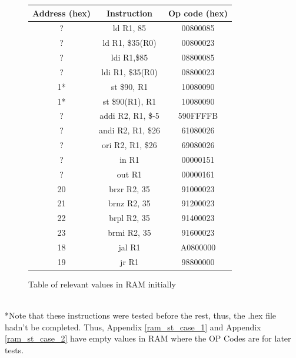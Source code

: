\documentclass{article}
\begin{document}
    \begin{figure}[h!] \label{relevant_ram_init}
        \begin{center}
            \begin{tabular}{|c|c|c|}
                \hline
                Address (hex) & Instruction & Op code (hex) \\
                \hline
                ? & ld R1, 85 & 00800085 \\
                \hline
                ? & ld R1, \$35(R0) & 00800023 \\
                \hline
                ? & ldi R1,\$85 & 08800085 \\
                \hline
                ? & ldi R1, \$35(R0) & 08800023 \\
                \hline
                1* & st \$90, R1 & 10080090 \\ %
                \hline
                1* & st \$90(R1), R1 & 10080090 \\ %
                \hline
                ? & addi R2, R1, \$-5 & 590FFFFB \\
                \hline
                ? & andi R2, R1, \$26 & 61080026 \\
                \hline
                ? & ori R2, R1, \$26 & 69080026 \\
                \hline
                ? & in R1  & 00000151 \\
                \hline
                ? & out R1  & 00000161 \\
                \hline
                20 & brzr R2, 35 & 91000023 \\
                \hline
                21 & brnz R2, 35 & 91200023 \\
                \hline
                22 & brpl R2, 35 & 91400023 \\
                \hline
                23 & brmi R2, 35 & 91600023 \\
                \hline
                18 & jal R1 & A0800000 \\ %
                \hline
                19 & jr R1 & 98800000 \\ %
                \hline
            \end{tabular}
            \caption{Table of relevant values in RAM initially}
        \end{center}
    \end{figure}
    \\
    \small{*Note that these instructions were tested before the rest, thus, the .hex file hadn't be completed. Thus, Appendix \ref{ram_st_case_1} and Appendix \ref{ram_st_case_2} have empty values in RAM where the OP Codes are for later tests.}
\end{document}

